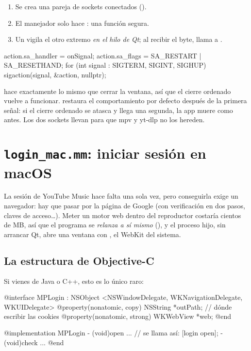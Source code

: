\begin{enumerate}
  \item Se crea una pareja de sockets conectados ().
  \item El manejador solo hace : una función segura.
  \item Un  vigila el otro extremo \emph{en el hilo de Qt}; al recibir el
  byte, llama a .
\end{enumerate}

\begin{codigo}
action.sa_handler = onSignal;
action.sa_flags = SA_RESTART | SA_RESETHAND;
for (int signal : {SIGTERM, SIGINT, SIGHUP})
    sigaction(signal, &action, nullptr);
\end{codigo}

 hace exactamente lo mismo que cerrar la ventana, así que el cierre ordenado
vuelve a funcionar.  restaura el comportamiento por defecto después de la
primera señal: si el cierre ordenado se atasca y llega una segunda, la app muere como antes.
Los dos sockets llevan  para que mpv y yt-dlp no los hereden.

\section{\texttt{login\_mac.mm}: iniciar sesión en macOS}

La sesión de YouTube Music hace falta una sola vez, pero conseguirla exige un navegador: hay
que pasar por la página de Google (con verificación en dos pasos, claves de acceso\dots).
Meter un motor web dentro del reproductor costaría cientos de MB, así que el programa se
\emph{relanza a sí mismo} (), y el proceso hijo, sin
arrancar Qt, abre una ventana con , el WebKit del sistema.

\subsection{La estructura de Objective-C}

Si vienes de Java o C++, esto es lo único raro:

\begin{codigo}
@interface MPLogin : NSObject <NSWindowDelegate, WKNavigationDelegate, WKUIDelegate>
@property(nonatomic, copy) NSString *outPath;   // dónde escribir las cookies
@property(nonatomic, strong) WKWebView *web;
@end

@implementation MPLogin
- (void)open { ... }        // se llama así:  [login open];
- (void)check { ... }
@end
\end{codigo}

